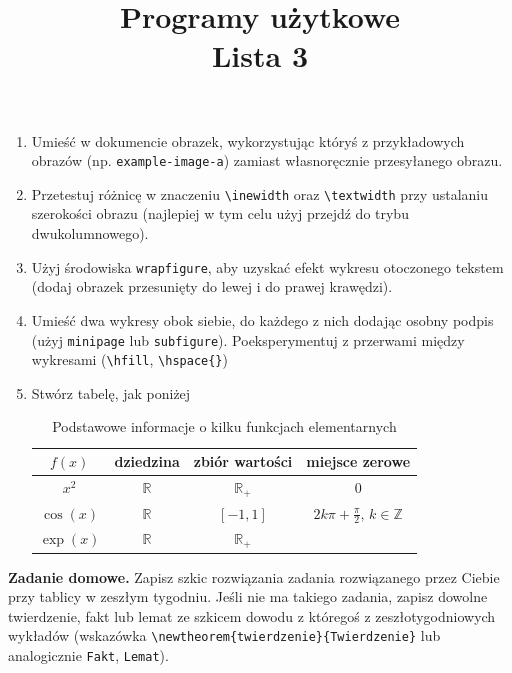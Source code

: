 \documentclass[12pt, letterpaper]{article}
\title{Programy użytkowe \\ Lista 3}
\author{ }
\date{}
\begin{document}
\maketitle
\begin{enumerate}
    \item Umieść w dokumencie obrazek, wykorzystując któryś z przykładowych obrazów (np. \texttt{example-image-a}) zamiast własnoręcznie przesyłanego obrazu.
    \item Przetestuj różnicę w znaczeniu \verb|\inewidth| oraz \verb|\textwidth| przy ustalaniu szerokości obrazu (najlepiej w tym celu użyj przejdź do trybu dwukolumnowego).
    \item Użyj środowiska \verb|wrapfigure|, aby uzyskać efekt wykresu otoczonego tekstem (dodaj obrazek przesunięty do lewej i do prawej krawędzi).
    \item Umieść dwa wykresy obok siebie, do każdego z nich dodając osobny podpis (użyj \verb|minipage| lub \verb|subfigure|). 
    Poeksperymentuj z przerwami między wykresami (\verb|\hfill|, \verb|\hspace{}|)
    
    \item Stwórz tabelę, jak poniżej
    \begin{table}[H]
        \centering
          \caption{Podstawowe informacje o kilku funkcjach elementarnych}
        \begin{tabular}{c c c c}
        \toprule
        $f(x)$ & dziedzina & zbiór wartości & miejsce zerowe \\
        \midrule
        \midrule
        ${x^2}$ & $\mathbb{R}$ & $\mathbb{R}_+$ & $0$ \\
        $\cos(x)$ & $\mathbb{R}$ & $[-1,1]$ & $2k\pi + \frac{\pi}{2},\,k\in\mathbb{Z}$ \\
       $ \exp(x)$ & $\mathbb{R}$ & $\mathbb{R}_+$ &\\
       \bottomrule
        \end{tabular}
        \label{fig:placeholder}
    \end{table}
\end{enumerate}
\textbf{Zadanie domowe.} Zapisz szkic rozwiązania zadania rozwiązanego przez Ciebie przy tablicy w zeszłym tygodniu. Jeśli nie ma takiego zadania, zapisz dowolne twierdzenie, fakt lub lemat ze szkicem dowodu z któregoś z zeszłotygodniowych wykładów (wskazówka \verb|\newtheorem{twierdzenie}{Twierdzenie}| lub analogicznie \texttt{Fakt}, \texttt{Lemat}).
\end{document}
